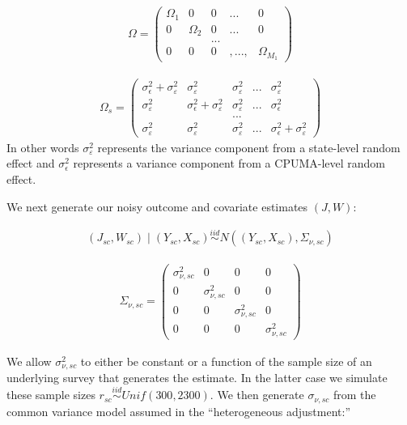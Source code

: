 \begin{align*}
    \Omega = \begin{pmatrix}
    \Omega_1 & 0 & 0 & ... & 0 \\
    0 & \Omega_2 & 0 &  ...  & 0 \\
    & & ...  & & \\
    0 & 0 & 0 &, ..., & \Omega_{M_1} 
    \end{pmatrix}
\end{align*}

\begin{align*}
    \Omega_s = \begin{pmatrix}
    \sigma^2_{\epsilon} + \sigma^2_{\varepsilon} & \sigma^2_{\varepsilon} & \sigma^2_{\varepsilon} & ... & \sigma^2_{\varepsilon} \\
    \sigma^2_{\varepsilon} & \sigma^2_{\epsilon} + \sigma^2_{\varepsilon} & \sigma^2_{\varepsilon}& ... & \sigma^2_{\epsilon} \\
    & & ... & & \\
    \sigma^2_{\varepsilon} & \sigma^2_{\varepsilon} & \sigma^2_{\varepsilon} & ... & \sigma^2_{\epsilon} + \sigma^2_{\varepsilon}
    \end{pmatrix}
\end{align*}
%
In other words $\sigma^2_{\varepsilon}$ represents the variance component from a state-level random effect and $\sigma^2_{\epsilon}$ represents a variance component from a CPUMA-level random effect.

We next generate our noisy outcome and covariate estimates $(J, W)$:

\begin{align*}
(J_{sc}, W_{sc}) \mid (Y_{sc}, X_{sc}) \stackrel{iid}\sim N((Y_{sc}, X_{sc}), \Sigma_{\nu, sc})
\end{align*}

\begin{align*}
    \Sigma_{\nu, sc} = \begin{pmatrix}
    \sigma^2_{\nu, sc} & 0 & 0 & 0 \\
    0 & \sigma^2_{\nu, sc} & 0 & 0 \\
    0 & 0 & \sigma^2_{\nu, sc} & 0 \\
    0 & 0 & 0 & \sigma^2_{\nu, sc}
    \end{pmatrix}
\end{align*}

We allow $\sigma^2_{\nu, sc}$ to either be constant or a function of the sample size of an underlying survey that generates the estimate. In the latter case we simulate these sample sizes $r_{sc} \stackrel{iid}\sim Unif(300, 2300)$. We then generate $\sigma_{\nu, sc}$ from the common variance model assumed in the ``heterogeneous adjustment:''

